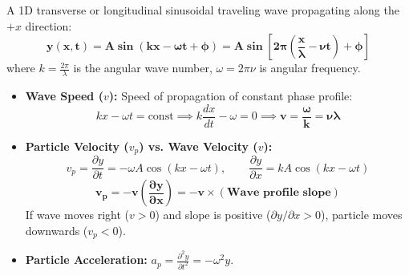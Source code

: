 \documentclass[10pt,a4paper]{article}
\begin{document}
\begin{conceptbox}
A 1D transverse or longitudinal sinusoidal traveling wave propagating along the $+x$ direction:
\begin{equation}
  \mathbf{y(x,t) = A \sin(k x - \omega t + \phi) = A \sin\left[2\pi\left(\frac{x}{\lambda} - \nu t\right) + \phi\right]}
\end{equation}
where $k = \frac{2\pi}{\lambda}$ is the angular wave number, $\omega = 2\pi\nu$ is angular frequency.
\begin{itemize}
  \item \textbf{Wave Speed ($v$):} Speed of propagation of constant phase profile:
  \begin{equation}
    k x - \omega t = \text{const} \implies k \frac{dx}{dt} - \omega = 0 \implies \mathbf{v = \frac{\omega}{k} = \nu \lambda}
  \end{equation}
  \item \textbf{Particle Velocity ($v_p$) vs. Wave Velocity ($v$):}
  \begin{equation}
    v_p = \frac{\partial y}{\partial t} = -\omega A \cos(k x - \omega t), \qquad \frac{\partial y}{\partial x} = k A \cos(k x - \omega t)
  \end{equation}
  \begin{equation}
    \mathbf{v_p = -v \left(\frac{\partial y}{\partial x}\right) = -v \times (\text{Wave profile slope})}
  \end{equation}
  If wave moves right ($v>0$) and slope is positive ($\partial y/\partial x > 0$), particle moves downwards ($v_p < 0$).
  \item \textbf{Particle Acceleration:} $a_p = \frac{\partial^2 y}{\partial t^2} = -\omega^2 y$.
\end{itemize}
\end{conceptbox}
\end{document}
